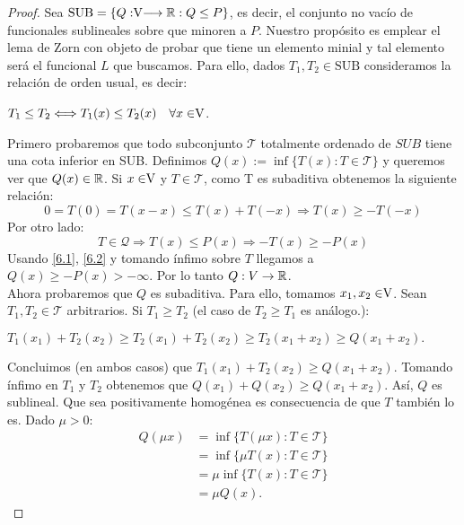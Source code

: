 	\begin{proof}
		Sea $ \text{SUB} = \lbrace Q:\vecSpace \longrightarrow \RR : Q \leq P \rbrace$, es decir, el conjunto no vacío de funcionales sublineales sobre \vecSpace que minoren a $ P $. Nuestro propósito es emplear el lema de Zorn con objeto de probar que tiene un elemento minial y tal elemento será el funcional $ L $ que buscamos. Para ello, dados $ T_1 ,T_2 \in \text{SUB} $ consideramos la relación de orden usual, es decir:
		\begin{center}
			$ T_1 \leq T_2 \Longleftrightarrow T_1 (x) \leq T_2 (x) \quad \forall x \in \vecSpace $.
		\end{center}
		Primero probaremos que todo subconjunto $ \mathcal{T} $ totalmente ordenado de $SUB $ tiene una cota inferior en  SUB. Definimos $ Q(x):=\inf \{ T(x): T \in \mathcal{T} \} $ y queremos ver que $ Q(x) \in \mathbb{R} $. Si $ x \in \vecSpace $ y $ T \in \mathcal{T} $, como T es subaditiva obtenemos la siguiente relación:
		\begin{equation}\label{6.1}
		 0 = T(0) = T(x-x) \leq T(x) + T(-x) \Longrightarrow T(x) \geq -T(-x)
		\end{equation}  
		Por otro lado:
		\begin{equation}\label{6.2}
		T \in \mathcal{Q} \Longrightarrow T(x) \leq P(x) \Longrightarrow -T(x) \geq -P(x)
		\end{equation}
		Usando \eqref{6.1}, \eqref{6.2} y tomando ínfimo sobre $  T $  llegamos a $ Q(x) \geq -P(x) > - \infty $. Por lo tanto $ Q:V \rightarrow \mathbb{R}$. \\
		
		Ahora probaremos que $ Q $ es subaditiva. Para ello, tomamos $ x_1, x_2\in \vecSpace $. Sean $ T_1 , T_2 \in \mathcal{T} $ arbitrarios. Si $ T_1 \geq T_2 $ (el caso de $ T_2 \geq T_1 $ es análogo.):
		
		\begin{center}
			$ T_1 (x_1)+  T_2 (x_2) \geq T_2(x_1)+  T_2 (x_2) \geq T_2(x_1 +x_2) \geq Q(x_1 + x_2).$
		\end{center}
		Concluimos (en ambos casos) que $ T_1 (x_1)+  T_2 (x_2) \geq Q(x_1 + x_2)$. Tomando ínfimo en $ T_1 $ y $ T_2 $ obtenemos que $ Q (x_1)+  Q(x_2) \geq Q(x_1 + x_2)$. Así, $ Q $ es sublineal. Que sea positivamente homogénea es consecuencia de que $ T $ también lo es. Dado $ \mu > 0 $:
		\begin{equation*}
		\begin{split}
		Q(\mu x) &=\inf \{ T(\mu x): T \in \mathcal{T} \} \\ 
		& = \inf \{ \mu T( x): T \in \mathcal{T} \} \\ 
		&= \mu\inf \{ T( x): T \in \mathcal{T} \} \\ 
		&= \mu Q(x). 
		\end{split}
		\end{equation*}
		

\end{proof}
